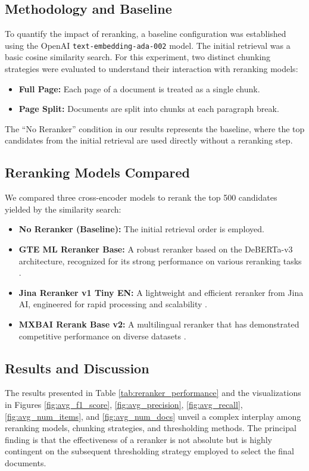 \subsection{Methodology and Baseline}
To quantify the impact of reranking, a baseline configuration was established using the OpenAI \texttt{text-embedding-ada-002} model. The initial retrieval was a basic cosine similarity search. For this experiment, two distinct chunking strategies were evaluated to understand their interaction with reranking models:
\begin{itemize}
    \item \textbf{Full Page:} Each page of a document is treated as a single chunk.
    \item \textbf{Page Split:} Documents are split into chunks at each paragraph break.
\end{itemize}
The \enquote{No Reranker} condition in our results represents the baseline, where the top candidates from the initial retrieval are used directly without a reranking step.

\subsection{Reranking Models Compared}

We compared three cross-encoder models to rerank the top 500 candidates yielded by the similarity search:
\begin{itemize}
    \item \textbf{No Reranker (Baseline):} The initial retrieval order is employed.
    \item \textbf{GTE ML Reranker Base:} A robust reranker based on the DeBERTa-v3 architecture, recognized for its strong performance on various reranking tasks \autocite{zhang2024mgte}.
    \item \textbf{Jina Reranker v1 Tiny EN:} A lightweight and efficient reranker from Jina AI, engineered for rapid processing and scalability \autocite{jina-reranker-v1-tiny-en}.
    \item \textbf{MXBAI Rerank Base v2:} A multilingual reranker that has demonstrated competitive performance on diverse datasets \autocite{v2rerank2025mxbai}.
\end{itemize}

\subsection{Results and Discussion}

The results presented in Table \ref{tab:reranker_performance} and the visualizations in Figures \ref{fig:avg_f1_score}, \ref{fig:avg_precision}, \ref{fig:avg_recall}, \ref{fig:avg_num_items}, and \ref{fig:avg_num_docs} unveil a complex interplay among reranking models, chunking strategies, and thresholding methods. The principal finding is that the effectiveness of a reranker is not absolute but is highly contingent on the subsequent thresholding strategy employed to select the final documents.

